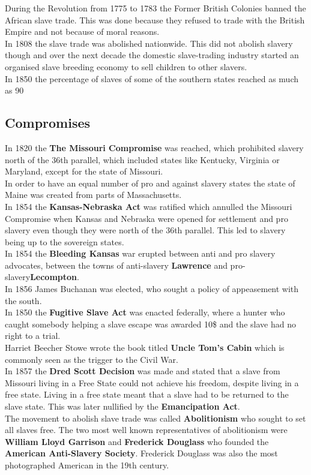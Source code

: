 \documentclass{article}
\begin{document}
	During the Revolution from 1775 to 1783 the Former British Colonies banned the African slave trade. This was done because they refused to trade with the British Empire and not because of moral reasons. \\
	In 1808 the slave trade was abolished nationwide. This did not abolish slavery though and over the next decade the domestic slave-trading industry started an organised slave breeding economy to sell children to other slavers. \\
	In 1850 the percentage of slaves of some of the southern states reached as much as 90%
	\subsection{Compromises}
	In 1820 the \textbf{The Missouri Compromise} was reached, which prohibited slavery north of the 36th parallel, which included states like Kentucky, Virginia or Maryland, except for the state of Missouri. \\
	In order to have an equal number of pro and against slavery states the state of Maine was created from parts of Massachusetts. \\
	In 1854 the \textbf{Kansas-Nebraska Act} was ratified which annulled the Missouri Compromise when Kansas and Nebraska were opened for settlement and pro slavery even though they were north of the 36th parallel. This led to slavery being up to the sovereign states. \\
	In 1854 the \textbf{Bleeding Kansas} war erupted between anti and pro slavery advocates, between the towns of anti-slavery \textbf{Lawrence} and  pro-slavery\textbf{Lecompton}. \\
	In 1856 James Buchanan was elected, who sought a policy of appeasement with the south. \\
	In 1850 the \textbf{Fugitive Slave Act} was enacted federally, where a hunter who caught somebody helping a slave escape was awarded 10\$ and the slave had no right to a trial. \\
	Harriet Beecher Stowe wrote the book titled \textbf{Uncle Tom's Cabin} which is commonly seen as the trigger to the Civil War. \\
	In 1857 the \textbf{Dred Scott Decision} was made and stated that a slave from Missouri living in a Free State could not achieve his freedom, despite living in a free state. Living in a free state meant that a slave had to be returned to the slave state. This was later nullified by the \textbf{Emancipation Act}. \\
	The movement to abolish slave trade was called \textbf{Abolitionism} who sought to set all slaves free. The two most well known representatives of abolitionism were \textbf{William Lloyd Garrison} and \textbf{Frederick Douglass} who founded the \textbf{American Anti-Slavery Society}. Frederick Douglass was also the most photographed American in the 19th century. \\
\end{document}
